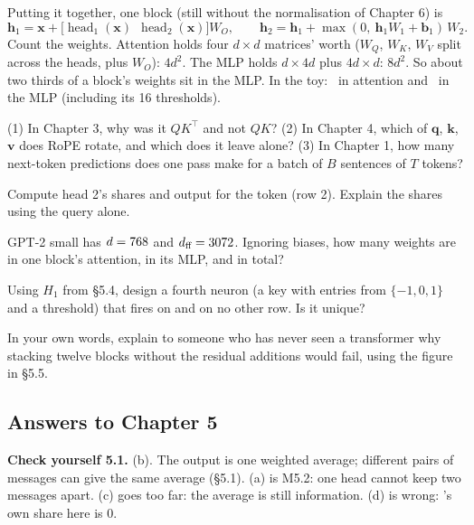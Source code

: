 Putting it together, one block (still without the normalisation of Chapter 6) is
\[
\bm{h}_1 = \bm{x} + \big[\operatorname{head}_1(\bm{x})\ \ \operatorname{head}_2(\bm{x})\big]W_O,\qquad
\bm{h}_2 = \bm{h}_1 + \max(0,\ \bm{h}_1W_1+\bm{b}_1)\,W_2 .
\]
Count the weights. Attention holds four $d\times d$ matrices' worth ($W_Q$, $W_K$, $W_V$ split across the heads,
plus $W_O$): $4d^2$. The MLP holds $d\times4d$ plus $4d\times d$: $8d^2$. So about two thirds of a block's
weights sit in the MLP. In the toy: \nFiveParamsAttn\ in attention and \nFiveParamsMlp\ in the MLP (including
its 16 thresholds).


\begin{lookingback}
(1) In Chapter 3, why was it $QK^\top$ and not $QK$? (2) In Chapter 4, which of $\bm{q}$, $\bm{k}$, $\bm{v}$
does RoPE rotate, and which does it leave alone? (3) In Chapter 1, how many next-token predictions does one pass
make for a batch of $B$ sentences of $T$ tokens?
\end{lookingback}

\begin{exercise}
Compute head 2's shares and output for the token  (row 2). Explain the shares using the query alone.
\end{exercise}
\begin{exercise}
GPT-2 small has $d=768$ and $d_{\text{ff}}=3072$. Ignoring biases, how many weights are in one
block's attention, in its MLP, and in total?
\end{exercise}
\begin{exercise}
Using $H_1$ from \S5.4, design a fourth neuron (a key with entries from $\{-1,0,1\}$ and a threshold) that fires
on  and on no other row. Is it unique?
\end{exercise}
\begin{exercise}
In your own words, explain to someone who has never seen a transformer why stacking twelve blocks without the
residual additions would fail, using the figure in \S5.5.
\end{exercise}

\subsection*{Answers to Chapter 5}
\small
\textbf{Check yourself 5.1.} (b). The output is one weighted average; different pairs of messages can give the
same average (\S5.1). (a) is M5.2: one head cannot keep two messages apart. (c) goes too far: the average is
still information. (d) is wrong: 's own share here is 0.

